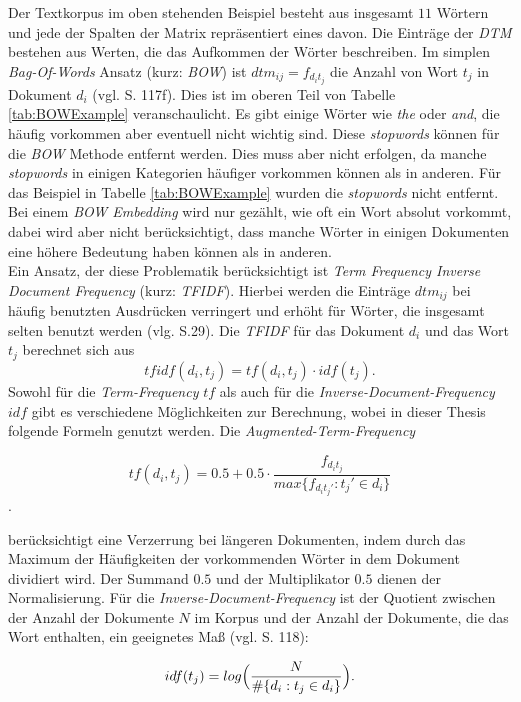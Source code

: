 \documentclass[a4paper,11pt]{article}
\begin{document}
Der Textkorpus im oben stehenden Beispiel besteht aus insgesamt $11$ Wörtern und jede der Spalten der Matrix repräsentiert eines davon.
Die Einträge der \textit{DTM} bestehen aus Werten, die das Aufkommen der Wörter beschreiben. Im simplen \textit{Bag-Of-Words} Ansatz (kurz: \textit{BOW}) ist $dtm_{ij} = f_{d_i t_j}$ die Anzahl von Wort $t_j$ in Dokument $d_i$ (vgl. \cite{deepEssentials} S. 117f). Dies ist im oberen Teil von Tabelle \ref{tab:BOWExample} veranschaulicht. Es gibt einige Wörter wie \textit{the} oder \textit{and}, die häufig vorkommen aber eventuell nicht wichtig sind. Diese \textit{stopwords} können für die \textit{BOW} Methode entfernt werden. Dies muss aber nicht erfolgen, da manche \textit{stopwords} in einigen Kategorien häufiger vorkommen können als in anderen. Für das Beispiel in Tabelle \ref{tab:BOWExample} wurden die \textit{stopwords} nicht entfernt.
Bei einem \textit{BOW Embedding} wird nur gezählt, wie oft ein Wort absolut vorkommt, dabei wird aber nicht berücksichtigt, dass manche Wörter in einigen Dokumenten eine höhere Bedeutung haben können als in anderen. \\

Ein Ansatz, der diese Problematik berücksichtigt ist \textit{Term Frequency Inverse Document Frequency} (kurz: \textit{TFIDF}). Hierbei werden die Einträge $dtm_{ij}$ bei häufig benutzten Ausdrücken verringert und erhöht für Wörter, die insgesamt selten benutzt werden (vlg. \cite{textMiningR} S.29). Die \textit{TFIDF} für das Dokument $d_i$ und das Wort $t_j$ berechnet sich aus 
\[tfidf(d_i, t_j) = tf(d_i,t_j) \cdot idf(t_j) . \]
Sowohl für die \textit{Term-Frequency} $tf$ als auch für die \textit{Inverse-Document-Frequency} $idf$ gibt es verschiedene Möglichkeiten zur Berechnung, wobei in dieser Thesis folgende Formeln genutzt werden.
Die \textit{Augmented-Term-Frequency}

\[tf(d_i,t_j) = 0.5 +  0.5 \cdot \frac{f_{d_i t_j}}{max \{ f_{d_i t_j'}: t_j' \in d_i \}} \].

berücksichtigt eine Verzerrung bei längeren Dokumenten, indem durch das Maximum der Häufigkeiten der vorkommenden Wörter in dem Dokument dividiert wird. Der Summand $0.5$ und der Multiplikator $0.5$ dienen der Normalisierung. Für die \textit{Inverse-Document-Frequency} ist der Quotient zwischen der Anzahl der Dokumente $N$ im Korpus und der Anzahl der Dokumente, die das Wort enthalten, ein geeignetes Maß (vgl. \cite{deepEssentials} S. 118):

\[idf(t_j) = log \Bigl( \frac{N}{\# \{d_i: t_j \in d_i \}} \Bigr) .\]
\end{document}
